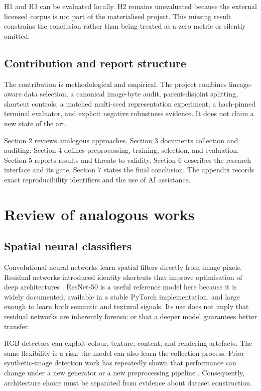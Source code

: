 \documentclass[12pt,a4paper]{article}
\begin{document}
H1 and H3 can be evaluated locally. H2 remains unevaluated because the external licensed corpus is
not part of the materialised project. This missing result constrains the conclusion rather than
being treated as a zero metric or silently omitted.

\subsection{Contribution and report structure}

The contribution is methodological and empirical. The project combines lineage-aware data
selection, a canonical image-byte audit, parent-disjoint splitting, shortcut controls, a matched
multi-seed representation experiment, a hash-pinned terminal evaluator, and explicit negative
robustness evidence. It does not claim a new state of the art.

Section 2 reviews analogous approaches. Section 3 documents collection and auditing. Section 4
defines preprocessing, training, selection, and evaluation. Section 5 reports results and threats
to validity. Section 6 describes the research interface and its gate. Section 7 states the final
conclusion. The appendix records exact reproducibility identifiers and the use of AI assistance.

\section{Review of analogous works}

\subsection{Spatial neural classifiers}

Convolutional neural networks learn spatial filters directly from image pixels. Residual networks
introduced identity shortcuts that improve optimisation of deep architectures \cite{he2016resnet}.
ResNet-50 is a useful reference model here because it is widely documented, available in a stable
PyTorch implementation, and large enough to learn both semantic and textural signals. Its use does
not imply that residual networks are inherently forensic or that a deeper model guarantees better
transfer.

RGB detectors can exploit colour, texture, content, and rendering artefacts. The same flexibility
is a risk: the model can also learn the collection process. Prior synthetic-image detection work
has repeatedly shown that performance can change under a new generator or a new preprocessing
pipeline \cite{ricker2022diffusion,corvi2023intriguing}. Consequently, architecture choice must be
separated from evidence about dataset construction.
\end{document}
